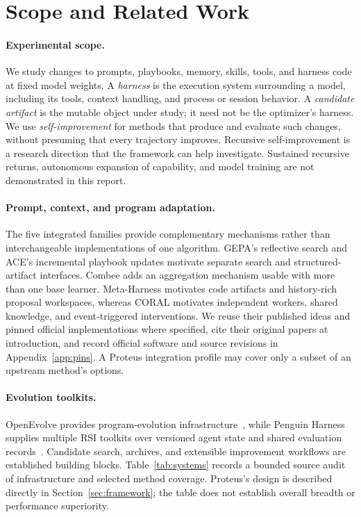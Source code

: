 \section{Scope and Related Work}
\label{sec:scope}

\paragraph{Experimental scope.}
We study changes to prompts, playbooks, memory, skills, tools, and harness code at fixed model weights. A \emph{harness} is the execution system surrounding a model, including its tools, context handling, and process or session behavior. A \emph{candidate artifact} is the mutable object under study; it need not be the optimizer's harness. We use \emph{self-improvement} for methods that produce and evaluate such changes, without presuming that every trajectory improves. Recursive self-improvement is a research direction that the framework can help investigate. Sustained recursive returns, autonomous expansion of capability, and model training are not demonstrated in this report.

\paragraph{Prompt, context, and program adaptation.}
The five integrated families provide complementary mechanisms rather than interchangeable implementations of one algorithm. GEPA's reflective search and ACE's incremental playbook updates motivate separate search and structured-artifact interfaces. Combee adds an aggregation mechanism usable with more than one base learner. Meta-Harness motivates code artifacts and history-rich proposal workspaces, whereas CORAL motivates independent workers, shared knowledge, and event-triggered interventions. We reuse their published ideas and pinned official implementations where specified, cite their original papers at introduction, and record official software and source revisions in Appendix~\ref{app:pins}. A Proteus integration profile may cover only a subset of an upstream method's options.

\paragraph{Evolution toolkits.}
OpenEvolve provides program-evolution infrastructure~\citep{openevolve_software}, while Penguin Harness supplies multiple RSI toolkits over versioned agent state and shared evaluation records~\citep{penguin_software}. Candidate search, archives, and extensible improvement workflows are established building blocks. Table~\ref{tab:systems} records a bounded source audit of infrastructure and selected method coverage. Proteus's design is described directly in Section~\ref{sec:framework}; the table does not establish overall breadth or performance superiority.

